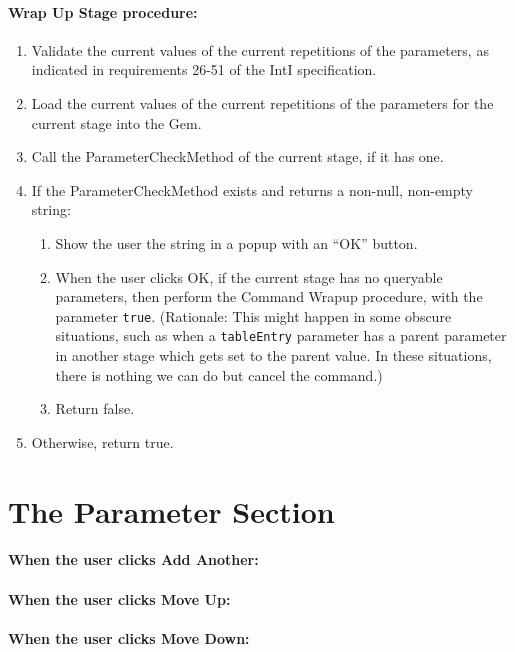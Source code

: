 \documentclass[11pt]{article}
\begin{document}
\paragraph{Wrap Up Stage procedure:}
\begin{enumerate}
\item Validate the current values of the current repetitions of the
  parameters, as indicated in requirements 26-51 of the IntI
  specification.
\item Load the current values of the current repetitions of the parameters
  for the current stage into the Gem.
\item Call the ParameterCheckMethod of the current stage, if it has one.
\item If the ParameterCheckMethod exists and returns a non-null, non-empty
  string:
  \begin{enumerate}
  \item Show the user the string in a popup with an ``OK'' button.
  \item When the user clicks OK, if the current stage has no queryable
    parameters, then perform the Command Wrapup procedure, with the
    parameter {\tt true}.  (Rationale:  This might happen in some obscure
    situations, such as when a {\tt tableEntry} parameter has a parent
    parameter in another stage which gets set to the parent value.  In
    these situations, there is nothing we can do but cancel the command.)
  \item Return false.
  \end{enumerate}
\item Otherwise, return true.
\end{enumerate}

\section{The Parameter Section}

\paragraph{When the user clicks Add Another:}

\paragraph{When the user clicks Move Up:}

\paragraph{When the user clicks Move Down:}
\end{document}
